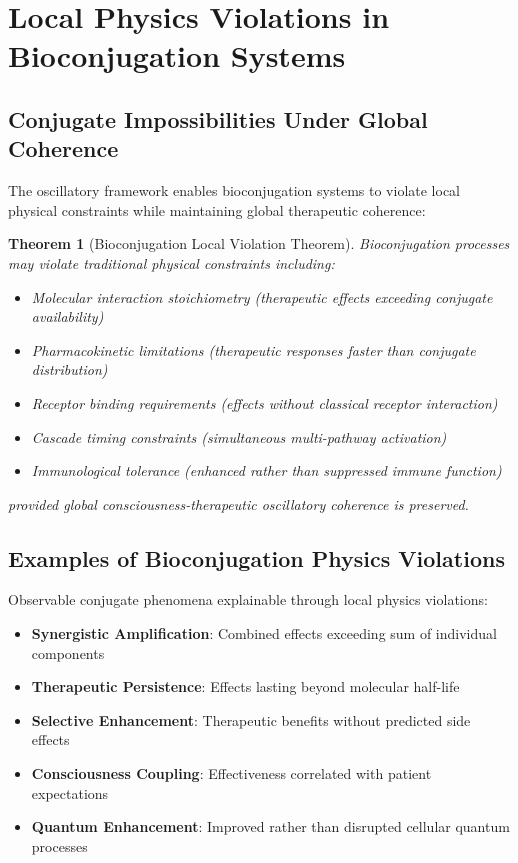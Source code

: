 \documentclass[12pt,a4paper]{article}
\newtheorem{theorem}{Theorem}
\begin{document}
\section{Local Physics Violations in Bioconjugation Systems}

\subsection{Conjugate Impossibilities Under Global Coherence}

The oscillatory framework enables bioconjugation systems to violate local physical constraints while maintaining global therapeutic coherence:

\begin{theorem}[Bioconjugation Local Violation Theorem]
Bioconjugation processes may violate traditional physical constraints including:
\begin{itemize}
\item Molecular interaction stoichiometry (therapeutic effects exceeding conjugate availability)
\item Pharmacokinetic limitations (therapeutic responses faster than conjugate distribution)
\item Receptor binding requirements (effects without classical receptor interaction)
\item Cascade timing constraints (simultaneous multi-pathway activation)
\item Immunological tolerance (enhanced rather than suppressed immune function)
\end{itemize}
provided global consciousness-therapeutic oscillatory coherence is preserved.
\end{theorem}

\subsection{Examples of Bioconjugation Physics Violations}

Observable conjugate phenomena explainable through local physics violations:

\begin{itemize}
\item \textbf{Synergistic Amplification}: Combined effects exceeding sum of individual components
\item \textbf{Therapeutic Persistence}: Effects lasting beyond molecular half-life
\item \textbf{Selective Enhancement}: Therapeutic benefits without predicted side effects
\item \textbf{Consciousness Coupling}: Effectiveness correlated with patient expectations
\item \textbf{Quantum Enhancement}: Improved rather than disrupted cellular quantum processes
\end{itemize}
\end{document}
